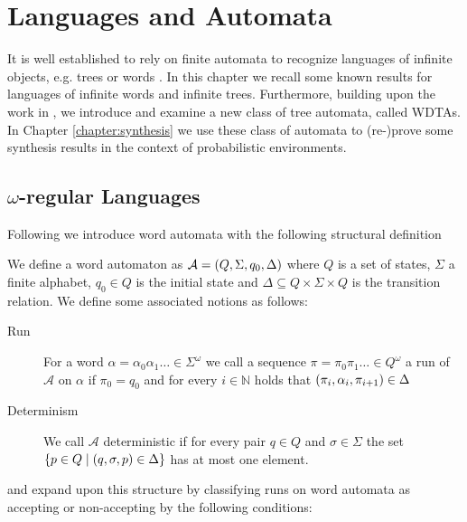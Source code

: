 \chapter{Languages and Automata}
It is well established to rely on finite automata to recognize languages of
infinite objects, e.g. trees or words \cite{LangAutoLog}. In this chapter we
recall some known results for languages of infinite words and infinite trees.
Furthermore, building upon the work in \cite{RandAutoInfTrees}, we introduce
and examine a new class of tree automata, called \aclp{WDTA}. In Chapter
\ref{chapter:synthesis} we use these class of automata to (re-)prove some
synthesis results in the context of probabilistic environments.

\section{$\omega$-regular Languages}
Following \cite{LangAutoLog} we introduce word automata with the following
structural definition
\begin{definition}
  We define a word automaton as
  $\mathcal{A} = \left(Q, \Sigma, q_{0}, \Delta\right)$ where
  $Q$ is a set of states, $\Sigma$ a finite alphabet, $q_{0}\in Q$ is the
  initial state and $\Delta\subseteq Q\times\Sigma\times Q$ is the transition
  relation. We define some associated notions as follows:
  \begin{description}
    \item [Run]
      For a word $\alpha = \alpha_{0}\alpha_{1}\dots\in\Sigma^{\omega}$ we call
      a sequence $\pi = \pi_{0}\pi_{1}\dots \in Q^{\omega}$ a run of
      $\mathcal{A}$ on $\alpha$ if $\pi_{0} = q_{0}$ and for every
      $i\in\mathbb{N}$ holds that
      $\left(\pi_{i}, \alpha_{i}, \pi_{i+1}\right)\in\Delta$
    \item [Determinism]
      We call $\mathcal{A}$ deterministic if for every pair $q\in Q$ and
      $\sigma\in\Sigma$ the set
      $\left\{p\in Q\mid\left(q,\sigma,p\right)\in\Delta\right\}$ has at most one
      element.
  \end{description}
\end{definition}
and expand upon this structure by classifying runs on word automata as
accepting or non-accepting by the following conditions:
